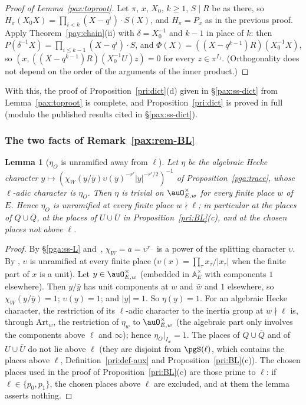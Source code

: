 \documentclass[10pt]{amsart}
\newtheorem{lemma}[theorem]{Lemma}
\theoremstyle{definition}
\theoremstyle{remark}
\begin{document}
\begin{proof}[Proof of Lemma~\ref{pax:toproot}]
Let $\pi$, $x$, $X_0$, $k\ge1$, $S\mid R$ be as there, so $H_\pi(X_0X)=\prod_{i<k}(X-q^i)\cdot S(X)$, and
$H_\pi=P_x$ as in the previous proof. Apply Theorem~\ref{pay:chain}(ii) with $\delta=X_0^{-1}$ and $k-1$ in
place of $k$: then $P(\delta^{-1}X)=\prod_{i\le k-1}(X-q^i)\cdot S$, and $\Phi(X)=((X-q^{k-1})R)(X_0^{-1}X)$,
so $(x,((X-q^{k-1})R)(X_0^{-1}U)z)=0$ for every $z\in\pi^{I_1}$. (Orthogonality does not depend on the
order of the arguments of the inner product.)
\end{proof}

With this, the proof of Proposition~\ref{pri:dict}(d) given in \S\ref{pax:ss-dict} from
Lemma~\ref{pax:toproot} is complete, and Proposition~\ref{pri:dict} is proved in full (modulo the
published results cited in \S\ref{pax:ss-dict}).

\subsubsection{The two facts of Remark~\ref{pax:rem-BL}}\label{pay:ss-BL}

\begin{lemma}[$\eta_O$ is unramified away from $\ell$]\label{pay:eta}
Let $\eta$ be the algebraic Hecke character $y\mapsto(\chi_W(y/\bar y)\allowbreak \upsilon(y)^{-r'}\allowbreak |y|^{-r'/2})^{-1}$
of Proposition~\ref{pga:trace}, whose $\ell$-adic character is $\eta_O$. Then $\eta$ is trivial on
$\auO_{E,w}^\times$ for every finite place $w$ of $E$. Hence $\eta_O$ is unramified at every finite
place $w\nmid\ell$; in particular at the places of $Q\cup\overline Q$, at the places of $U\cup
\overline U$ in Proposition~\ref{pri:BL}(c), and at the chosen places not above $\ell$.
\end{lemma}
\begin{proof}
By \S\ref{pga:ss-L} and~{\cite[(1)]{P54}}, $\chi_W=a=\upsilon^{r_-}$ is a power of the splitting
character $\upsilon$. By {\cite[\S5.2.1]{P49}}, $\upsilon$ is unramified at every finite place
($\upsilon(x)=\prod_\tau x_\tau/|x_\tau|$ when the finite part of $x$ is a unit). Let $y\in
\auO_{E,w}^\times$ (embedded in $\mathbb A_E^\times$ with components $1$ elsewhere). Then $y/\bar y$ has
unit components at $w$ and $\bar w$ and $1$ elsewhere, so $\chi_W(y/\bar y)=1$; $\upsilon(y)=1$; and
$|y|=1$. So $\eta(y)=1$. For an algebraic Hecke character, the restriction of its $\ell$-adic character
to the inertia group at $w\nmid\ell$ is, through $\mathrm{Art}_w$, the restriction of $\eta_w$ to
$\auO_{E,w}^\times$ (the algebraic part only involves the components above $\ell$ and $\infty$); hence
$\eta_O|_{I_w}=1$. The places of $Q\cup\overline Q$ and of $U\cup\overline U$ do not lie above $\ell$
(they are disjoint from $\pgS(\ell)$, which contains the places above $\ell$, Definition~\ref{pri:def-aux}
and Proposition~\ref{pri:BL}(c)). The chosen places used in the proof of Proposition~\ref{pri:BL}(c) are those prime to $\ell$: if $\ell\in\{p_0,p_1\}$, the chosen places above $\ell$ are excluded, and at them the lemma asserts nothing.
\end{proof}
\end{document}

